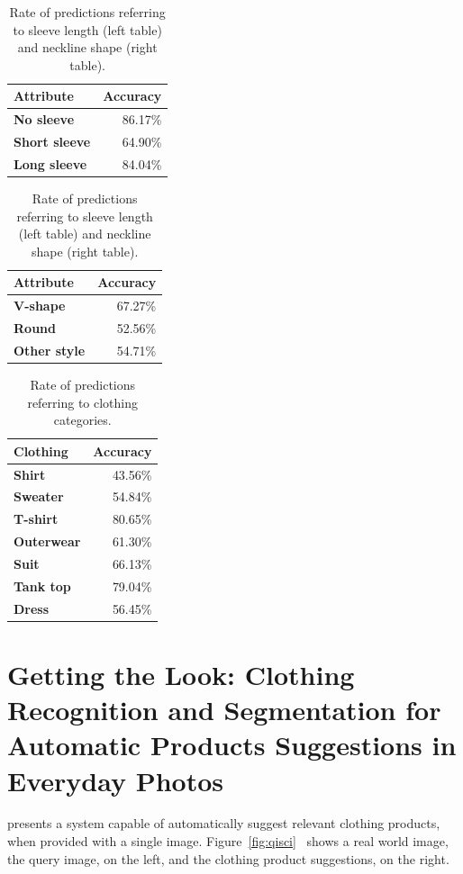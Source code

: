 \documentclass[titlepage,12pt,a4paper,times]{book}
\begin{document}
\begin{table}[!h]
\centering
\begin{tabular}{|l|r|}
\hline
\textbf{Attribute} & \textbf{Accuracy}\\
\hline
\hline
\textbf{No sleeve} & 86.17\% \\
\hline
\textbf{Short sleeve} & 64.90\% \\
\hline
\textbf{Long sleeve} & 84.04\% \\
\hline
\end{tabular}
\quad
\begin{tabular}{|l|r|}
\hline
\textbf{Attribute} & \textbf{Accuracy}\\
\hline
\hline
\textbf{V-shape} & 67.27\% \\
\hline
\textbf{Round} & 52.56\% \\
\hline
\textbf{Other style} & 54.71\% \\
\hline
\end{tabular}
\caption{Rate of predictions referring to sleeve length (left table) and
neckline shape (right table).}
\label{tab:ropsn}
\end{table}
\FloatBarrier

\begin{table}[!h]
\centering
\begin{tabular}{|l|r|}
\hline
\textbf{Clothing} & \textbf{Accuracy}\\
\hline
\hline
\textbf{Shirt} & 43.56\% \\
\hline
\textbf{Sweater} & 54.84\% \\
\hline
\textbf{T-shirt} & 80.65\% \\
\hline
\textbf{Outerwear} & 61.30\% \\
\hline
\textbf{Suit} & 66.13\% \\
\hline
\textbf{Tank top} & 79.04\% \\
\hline
\textbf{Dress} & 56.45\% \\
\hline
\end{tabular}
\caption{Rate of predictions referring to clothing categories.}
\label{tab:ropcc}
\end{table}
\FloatBarrier

\section{Getting the Look: Clothing Recognition and Segmentation for Automatic
Products Suggestions in Everyday Photos}
\label{chap2:sec:art3}
\citep{3} presents a system capable of automatically suggest relevant clothing
products, when provided with a single image. Figure~\ref{fig:qisci}~\citep{3}
shows a real world image, the query image, on the left, and the clothing product
suggestions, on the right.
\end{document}
